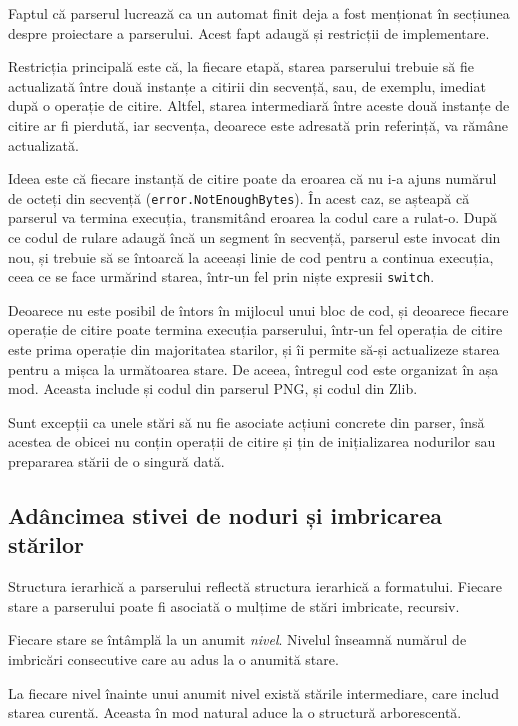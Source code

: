 \documentclass[a4paper,12pt]{report}
\begin{document}
Faptul că parserul lucrează ca un automat finit deja a fost
menționat în secțiunea despre proiectare a parserului.
Acest fapt adaugă și restricții de implementare.

Restricția principală este că, la fiecare etapă, starea parserului trebuie să fie actualizată
între două instanțe a citirii din secvență, sau, de exemplu, imediat după o operație de citire.
Altfel, starea intermediară între aceste două instanțe de citire ar fi pierdută,
iar secvența, deoarece este adresată prin referință, va rămâne actualizată.

Ideea este că fiecare instanță de citire poate da eroarea
că nu i-a ajuns numărul de octeți din secvență (\texttt{error.NotEnoughBytes}).
În acest caz, se așteapă că parserul va termina execuția,
transmitând eroarea la codul care a rulat-o.
După ce codul de rulare adaugă încă un segment în secvență,
parserul este invocat din nou, și trebuie să se întoarcă
la aceeași linie de cod pentru a continua execuția,
ceea ce se face urmărind starea, într-un fel prin niște expresii \texttt{switch}.

Deoarece nu este posibil de întors în mijlocul unui bloc de cod,
și deoarece fiecare operație de citire poate termina execuția parserului,
într-un fel operația de citire este prima operație din majoritatea starilor,
și îi permite să-și actualizeze starea pentru a mișca la următoarea stare.
De aceea, întregul cod este organizat în așa mod.
Aceasta include și codul din parserul \ac{PNG}, și codul din Zlib.

Sunt excepții ca unele stări să nu fie asociate acțiuni concrete din parser,
însă acestea de obicei nu conțin operații de citire și țin de inițializarea nodurilor
sau prepararea stării de o singură dată.

\subsection{Adâncimea stivei de noduri și imbricarea stărilor}

Structura ierarhică a parserului reflectă structura ierarhică a formatului.
Fiecare stare a parserului poate fi asociată o mulțime de stări imbricate, recursiv.

Fiecare stare se întâmplă la un anumit \textit{nivel}. 
Nivelul înseamnă numărul de imbricări consecutive care au adus la o anumită stare.

La fiecare nivel înainte unui anumit nivel există stările intermediare, care includ starea curentă.
Aceasta în mod natural aduce la o structură arborescentă.
\end{document}
